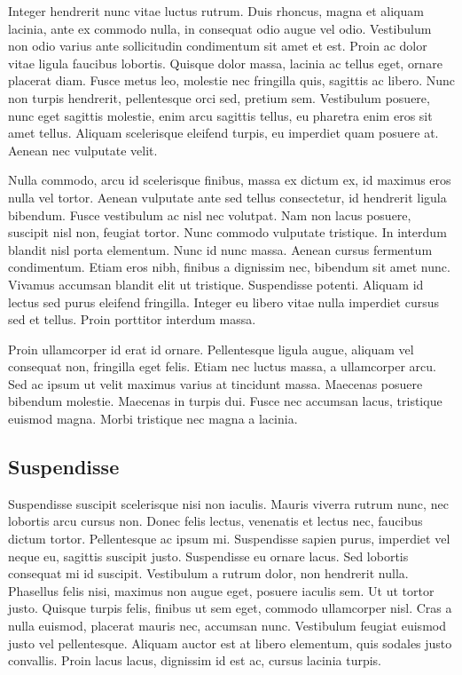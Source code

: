 \documentclass[twoside,openright,a4paper,11pt,french]{article}
\begin{document}
Integer hendrerit nunc vitae luctus rutrum. Duis rhoncus, magna et aliquam lacinia, ante ex commodo nulla, in consequat odio augue vel odio. Vestibulum non odio varius ante sollicitudin condimentum sit amet et est. Proin ac dolor vitae ligula faucibus lobortis. Quisque dolor massa, lacinia ac tellus eget, ornare placerat diam. Fusce metus leo, molestie nec fringilla quis, sagittis ac libero. Nunc non turpis hendrerit, pellentesque orci sed, pretium sem. Vestibulum posuere, nunc eget sagittis molestie, enim arcu sagittis tellus, eu pharetra enim eros sit amet tellus. Aliquam scelerisque eleifend turpis, eu imperdiet quam posuere at. Aenean nec vulputate velit.

Nulla commodo, arcu id scelerisque finibus, massa ex dictum ex, id maximus eros nulla vel tortor. Aenean vulputate ante sed tellus consectetur, id hendrerit ligula bibendum. Fusce vestibulum ac nisl nec volutpat. Nam non lacus posuere, suscipit nisl non, feugiat tortor. Nunc commodo vulputate tristique. In interdum blandit nisl porta elementum. Nunc id nunc massa. Aenean cursus fermentum condimentum. Etiam eros nibh, finibus a dignissim nec, bibendum sit amet nunc. Vivamus accumsan blandit elit ut tristique. Suspendisse potenti. Aliquam id lectus sed purus eleifend fringilla. Integer eu libero vitae nulla imperdiet cursus sed et tellus. Proin porttitor interdum massa.

Proin ullamcorper id erat id ornare. Pellentesque ligula augue, aliquam vel consequat non, fringilla eget felis. Etiam nec luctus massa, a ullamcorper arcu. Sed ac ipsum ut velit maximus varius at tincidunt massa. Maecenas posuere bibendum molestie. Maecenas in turpis dui. Fusce nec accumsan lacus, tristique euismod magna. Morbi tristique nec magna a lacinia.

\subsection{Suspendisse}

Suspendisse suscipit scelerisque nisi non iaculis. Mauris viverra rutrum nunc, nec lobortis arcu cursus non. Donec felis lectus, venenatis et lectus nec, faucibus dictum tortor. Pellentesque ac ipsum mi. Suspendisse sapien purus, imperdiet vel neque eu, sagittis suscipit justo. Suspendisse eu ornare lacus. Sed lobortis consequat mi id suscipit. Vestibulum a rutrum dolor, non hendrerit nulla. Phasellus felis nisi, maximus non augue eget, posuere iaculis sem. Ut ut tortor justo. Quisque turpis felis, finibus ut sem eget, commodo ullamcorper nisl. Cras a nulla euismod, placerat mauris nec, accumsan nunc. Vestibulum feugiat euismod justo vel pellentesque. Aliquam auctor est at libero elementum, quis sodales justo convallis. Proin lacus lacus, dignissim id est ac, cursus lacinia turpis.
\end{document}
